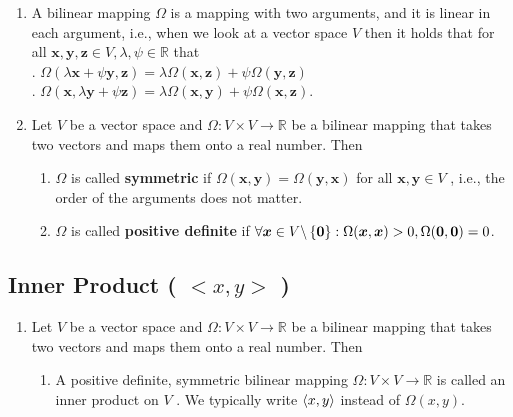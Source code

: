\begin{enumerate}
    \item A bilinear mapping $\Omega$ is a mapping with two arguments, and it is linear in each argument, i.e., when we look at a vector space $V$ then it holds that for all $\bm{x}, \bm{y}, \bm{z} \in V, \lambda , \psi  \in \mathbb{R}$ that
    \hfill \cite{mfml/book/mml/Deisenroth-Faisal-Ong}
    \\
    .\hfill
    $\Omega(\lambda \bm{x} + \psi \bm{y}, \bm{z}) = \lambda \Omega(\bm{x}, \bm{z}) + \psi \Omega(\bm{y}, \bm{z})$
    \hfill \cite{mfml/book/mml/Deisenroth-Faisal-Ong}
    \\
    .\hfill
    $\Omega(\bm{x}, \lambda \bm{y} + \psi \bm{z}) = \lambda \Omega(\bm{x}, \bm{y}) + \psi \Omega(\bm{x}, \bm{z})$.
    \hfill \cite{mfml/book/mml/Deisenroth-Faisal-Ong}

    \item Let $V$ be a vector space and $\Omega : V \times  V \to \mathbb{R}$ be a bilinear mapping that takes two vectors and maps them onto a real number. Then
    \hfill \cite{mfml/book/mml/Deisenroth-Faisal-Ong}
    \begin{enumerate}
        \item $\Omega$ is called \textbf{symmetric} if $\Omega(\bm{x}, \bm{y}) = \Omega(\bm{y}, \bm{x})$ for all $\bm{x}, \bm{y} \in  V$ , i.e., the order of the arguments does not matter.
        \hfill \cite{mfml/book/mml/Deisenroth-Faisal-Ong}

        \item $\Omega$ is called \textbf{positive definite} if $\forall \bm{x} \in  V \backslash \left\{\bm{0}\right\} : \Omega(\bm{x}, \bm{x}) > 0 , \Omega(\bm{0}, \bm{0}) = 0$.
        \hfill \cite{mfml/book/mml/Deisenroth-Faisal-Ong}
    \end{enumerate}

\end{enumerate}





\subsection{Inner Product ( $<x, y>$ )}

\begin{enumerate}
    \item Let $V$ be a vector space and $\Omega  : V \times  V \to  \mathbb{R}$ be a bilinear mapping that takes two vectors and maps them onto a real number. Then
    \begin{enumerate}
        \item A positive definite, symmetric bilinear mapping $\Omega  : V \times  V \to  \mathbb{R}$ is called an inner product on $V$ . 
        We typically write $\langle x, y\rangle$ instead of $\Omega (x, y)$.        
    \end{enumerate}
\end{enumerate}





